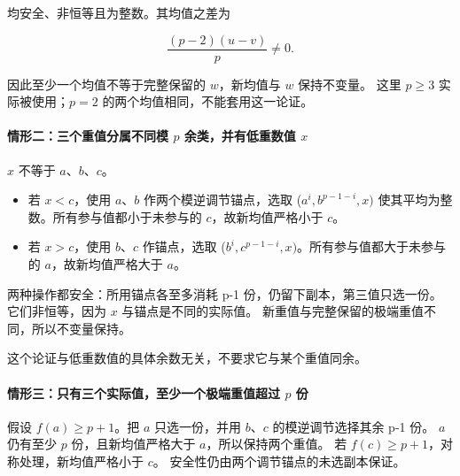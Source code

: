 \documentclass[11pt,a4paper]{article}
\newcommand{\tightlist}{\setlength{\itemsep}{0pt}\setlength{\parskip}{0pt}}
\theoremstyle{definition}
\numberwithin{equation}{section}
\begin{document}
{均安全、非恒等且为整数。其均值之差为}

\[
\frac{(p-2)(u-v)}p\ne0.
\]

{因此至少一个均值不等于完整保留的} {\ensuremath{w}，新均值与} {\ensuremath{w}} {保持不变量。} {这里} {\ensuremath{p\ge 3}} {实际被使用；\ensuremath{p=2}} {的两个均值相同，不能套用这一论证。}

\paragraph*{\texorpdfstring{{情形二：三个重值分属不同模} {\ensuremath{p}} {余类，并有低重数值} {\ensuremath{x}}}{情形二：三个重值分属不同模  余类，并有低重数值 }}\label{C3-h15}

{\ensuremath{x}} {不等于} {\ensuremath{a}、\ensuremath{b}、\ensuremath{c}。}

\begin{itemize}
\tightlist
\item
  {若} {\ensuremath{x<c}，使用} {\ensuremath{a}、\ensuremath{b}} {作两个模逆调节锚点，选取} {(\ensuremath{a^{i},b^{p-1-i},x)}} {使其平均为整数。所有参与值都小于未参与的} {\ensuremath{c}，故新均值严格小于} {\ensuremath{c}。}
\item
  {若} {\ensuremath{x>c}，使用} {\ensuremath{b}、\ensuremath{c}} {作锚点，选取} {(\ensuremath{b^{i},c^{p-1-i},x)}。所有参与值都大于未参与的} {\ensuremath{a}，故新均值严格大于} {\ensuremath{a}。}
\end{itemize}

{两种操作都安全：所用锚点各至多消耗} {p-1} {份，仍留下副本，第三值只选一份。} {它们非恒等，因为} {\ensuremath{x}} {与锚点是不同的实际值。} {新重值与完整保留的极端重值不同，所以不变量保持。}

{这个论证与低重数值的具体余数无关，不要求它与某个重值同余。}

\paragraph*{\texorpdfstring{{情形三：只有三个实际值，至少一个极端重值超过} {\ensuremath{p}} {份}}{情形三：只有三个实际值，至少一个极端重值超过  份}}\label{C3-h16}

{假设} {\ensuremath{f(a)\ge p+1}。把} {\ensuremath{a}} {只选一份，并用} {\ensuremath{b}、\ensuremath{c}} {的模逆调节选择其余} {p-1} {份。} {\ensuremath{a}} {仍有至少} {\ensuremath{p}} {份，且新均值严格大于} {\ensuremath{a}，所以保持两个重值。} {若} {\ensuremath{f(c)\ge p+1}，对称处理，新均值严格小于} {\ensuremath{c}。} {安全性仍由两个调节锚点的未选副本保证。}
\end{document}
